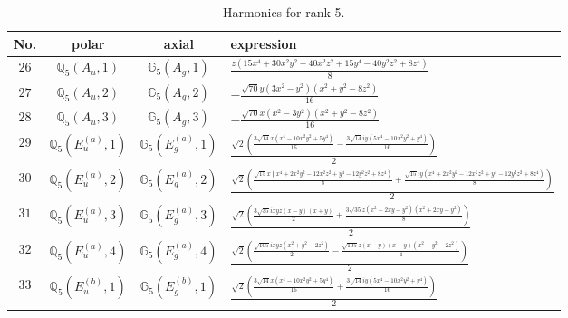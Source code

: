 \documentclass[fleqn,8pt,landscape]{jsarticle}
\begin{document}
\begin{table}[ht!]
\begin{center}
\caption{Harmonics for rank 5.}
\renewcommand{\arraystretch}{1.3}
\begin{tabular}{cccl} \hline \hline
No. & polar & axial & expression \\ \hline
$ 26 $ & $ \mathbb{Q}_{5}(A_{u},1) $ & $ \mathbb{G}_{5}(A_{g},1) $ & $ \frac{z \left(15 x^{4} + 30 x^{2} y^{2} - 40 x^{2} z^{2} + 15 y^{4} - 40 y^{2} z^{2} + 8 z^{4}\right)}{8} $ \\
$ 27 $ & $ \mathbb{Q}_{5}(A_{u},2) $ & $ \mathbb{G}_{5}(A_{g},2) $ & $ - \frac{\sqrt{70} y \left(3 x^{2} - y^{2}\right) \left(x^{2} + y^{2} - 8 z^{2}\right)}{16} $ \\
$ 28 $ & $ \mathbb{Q}_{5}(A_{u},3) $ & $ \mathbb{G}_{5}(A_{g},3) $ & $ - \frac{\sqrt{70} x \left(x^{2} - 3 y^{2}\right) \left(x^{2} + y^{2} - 8 z^{2}\right)}{16} $ \\
$ 29 $ & $ \mathbb{Q}_{5}(E_{u}^{(a)},1) $ & $ \mathbb{G}_{5}(E_{g}^{(a)},1) $ & $ \frac{\sqrt{2} \left(\frac{3 \sqrt{14} x \left(x^{4} - 10 x^{2} y^{2} + 5 y^{4}\right)}{16} - \frac{3 \sqrt{14} i y \left(5 x^{4} - 10 x^{2} y^{2} + y^{4}\right)}{16}\right)}{2} $ \\
$ 30 $ & $ \mathbb{Q}_{5}(E_{u}^{(a)},2) $ & $ \mathbb{G}_{5}(E_{g}^{(a)},2) $ & $ \frac{\sqrt{2} \left(\frac{\sqrt{15} x \left(x^{4} + 2 x^{2} y^{2} - 12 x^{2} z^{2} + y^{4} - 12 y^{2} z^{2} + 8 z^{4}\right)}{8} + \frac{\sqrt{15} i y \left(x^{4} + 2 x^{2} y^{2} - 12 x^{2} z^{2} + y^{4} - 12 y^{2} z^{2} + 8 z^{4}\right)}{8}\right)}{2} $ \\
$ 31 $ & $ \mathbb{Q}_{5}(E_{u}^{(a)},3) $ & $ \mathbb{G}_{5}(E_{g}^{(a)},3) $ & $ \frac{\sqrt{2} \left(\frac{3 \sqrt{35} i x y z \left(x - y\right) \left(x + y\right)}{2} + \frac{3 \sqrt{35} z \left(x^{2} - 2 x y - y^{2}\right) \left(x^{2} + 2 x y - y^{2}\right)}{8}\right)}{2} $ \\
$ 32 $ & $ \mathbb{Q}_{5}(E_{u}^{(a)},4) $ & $ \mathbb{G}_{5}(E_{g}^{(a)},4) $ & $ \frac{\sqrt{2} \left(\frac{\sqrt{105} i x y z \left(x^{2} + y^{2} - 2 z^{2}\right)}{2} - \frac{\sqrt{105} z \left(x - y\right) \left(x + y\right) \left(x^{2} + y^{2} - 2 z^{2}\right)}{4}\right)}{2} $ \\
$ 33 $ & $ \mathbb{Q}_{5}(E_{u}^{(b)},1) $ & $ \mathbb{G}_{5}(E_{g}^{(b)},1) $ & $ \frac{\sqrt{2} \left(\frac{3 \sqrt{14} x \left(x^{4} - 10 x^{2} y^{2} + 5 y^{4}\right)}{16} + \frac{3 \sqrt{14} i y \left(5 x^{4} - 10 x^{2} y^{2} + y^{4}\right)}{16}\right)}{2} $ \\

\end{tabular}
\end{center}
\end{table}
\end{document}
